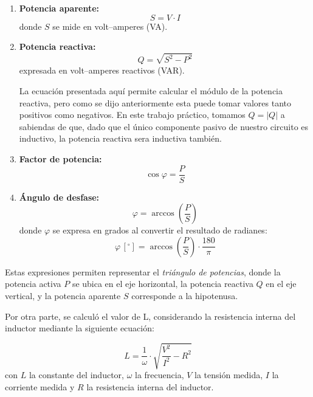 \documentclass{article}
\begin{document}
            \begin{enumerate}
                \item \textbf{Potencia aparente:}
                \[
                    S = V \cdot I
                \]
                donde $S$ se mide en volt–amperes (VA).

                \item \textbf{Potencia reactiva:}
                \[
                    Q = \sqrt{S^{2} - P^{2}}
                \]
                expresada en volt–amperes reactivos (VAR). \par
                
                La ecuación presentada aquí permite calcular el módulo de la potencia reactiva, pero como se dijo
                anteriormente esta puede tomar valores tanto positivos como negativos. En este trabajo práctico, 
                tomamos $Q=|Q|$ a sabiendas de que, dado que el único componente pasivo de nuestro circuito es inductivo, 
                la potencia reactiva sera inductiva también.

                \item \textbf{Factor de potencia:}
                \[
                    \cos \varphi = \frac{P}{S}
                \]

                \item \textbf{Ángulo de desfase:}
                \[
                    \varphi = \arccos\left( \frac{P}{S} \right)
                \]
                donde $\varphi$ se expresa en grados al convertir el resultado de 
                radianes:
                \[
                    \varphi \,[^\circ] = \arccos\left( \frac{P}{S} \right) \cdot 
                    \frac{180}{\pi}
                \]
            \end{enumerate}

                    Estas expresiones permiten representar el \textit{triángulo de potencias}, 
                    donde la potencia activa $P$ se ubica en el eje horizontal, la potencia 
                    reactiva $Q$ en el eje vertical, y la potencia aparente $S$ corresponde a 
                    la hipotenusa.\par

                Por otra parte, se calculó el valor de L, considerando la resistencia interna del inductor mediante la siguiente ecuación:

                \begin{equation*}
                    L = \frac{1}{\omega} \cdot \sqrt{\frac{V^2}{I^2}-R^2}
                \end{equation*}
                con $L$ la constante del inductor, $\omega$ la frecuencia, $V$ la tensión medida, $I$ la corriente medida y $R$ la resistencia interna del inductor. \par
                
\end{document}

